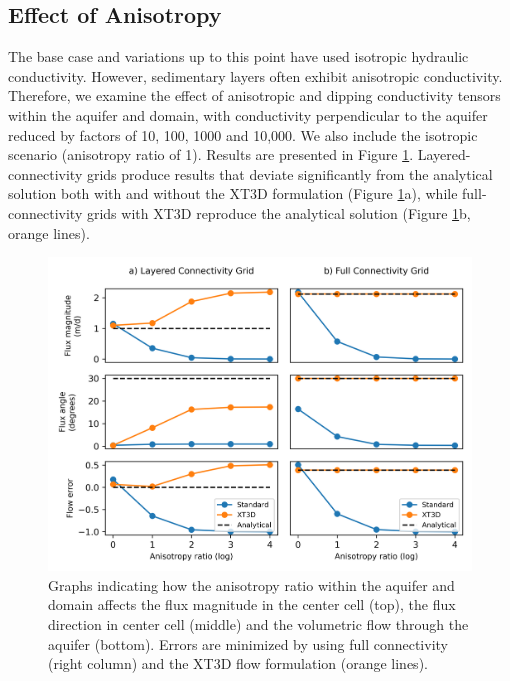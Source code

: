 \documentclass{article}
\begin{document}
\subsection{Effect of Anisotropy}

The base case and variations up to this point have used isotropic hydraulic conductivity. However, sedimentary layers often exhibit anisotropic conductivity. Therefore, we examine the effect of anisotropic and dipping conductivity tensors within the aquifer and domain, with conductivity perpendicular to the aquifer reduced by factors of 10, 100, 1000 and 10,000. We also include the isotropic scenario (anisotropy ratio of 1). Results are presented in Figure \ref{fig:fig5}. Layered-connectivity grids produce results that deviate significantly from the analytical solution both with and without the XT3D formulation (Figure \ref{fig:fig5}a), while full-connectivity grids with XT3D reproduce the analytical solution (Figure \ref{fig:fig5}b, orange lines).

\begin{figure}
	\begin{center}
	\includegraphics[scale=0.9]{../figures/fig5paper.png}
	\caption{Graphs indicating how the anisotropy ratio within the aquifer and domain affects the flux magnitude in the center cell (top), the flux direction in center cell (middle) and the volumetric flow through the aquifer (bottom). Errors are minimized by using full connectivity (right column) and the XT3D flow formulation (orange lines).}
	\label{fig:fig5}
	\end{center}
\end{figure}
\end{document}
